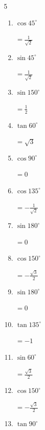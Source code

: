 \begin{multicols}{5}
\begin{enumerate}
  \item $\displaystyle \cos{45^\circ}$

        $\displaystyle =\frac{1}{\sqrt{2}}$

\columnbreak %

\resetques

  \item $\displaystyle \sin{45^\circ}$

        $\displaystyle =\frac{1}{\sqrt{2}}$

  \item $\displaystyle \sin{150^\circ}$

        $\displaystyle =\frac{1}{2}$

  \item $\displaystyle \tan{60^\circ}$

        $\displaystyle =\sqrt{3}$

  \item $\displaystyle \cos{90^\circ}$

        $\displaystyle =0$

  \item $\displaystyle \cos{135^\circ}$

        $\displaystyle =-\frac{1}{\sqrt{2}}$

  \item $\displaystyle \sin{180^\circ}$

        $\displaystyle =0$

  \item $\displaystyle \cos{150^\circ}$

        $\displaystyle =-\frac{\sqrt{3}}{2}$

  \item $\displaystyle \sin{180^\circ}$

        $\displaystyle =0$

  \item $\displaystyle \tan{135^\circ}$

        $\displaystyle =-1$

  \item $\displaystyle \sin{60^\circ}$

        $\displaystyle =\frac{\sqrt{3}}{2}$

  \item $\displaystyle \cos{150^\circ}$

        $\displaystyle =-\frac{\sqrt{3}}{2}$

  \item $\displaystyle \tan{90^\circ}$


\end{enumerate}
\end{multicols}
